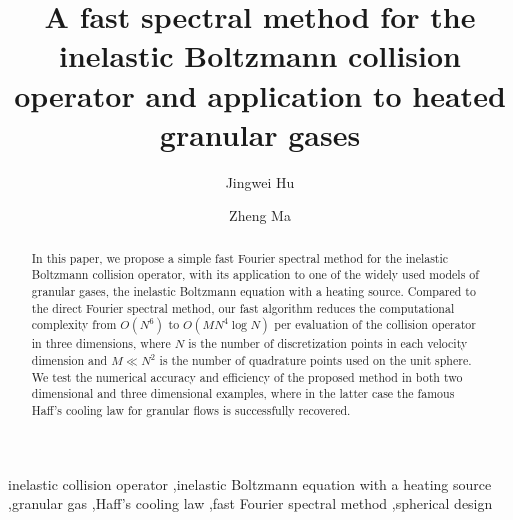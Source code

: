 \documentclass[review, times]{elsarticle}
\begin{document}
\begin{frontmatter}

\title{A fast spectral method for the inelastic Boltzmann collision operator and application to heated granular gases}


\author[mymainaddress]{Jingwei Hu}

\author[mymainaddress]{Zheng Ma}

\address[mymainaddress]{Department of Mathematics, Purdue University\\150 N. University Street, West Lafayette, IN 47907, USA}

\begin{abstract}
In this paper, we propose a simple fast Fourier spectral method for the inelastic Boltzmann collision operator, with its application to one of the widely used models of granular gases, the inelastic Boltzmann equation with a heating source. Compared to the direct Fourier spectral method, our fast algorithm reduces the computational complexity from $O\left(N^6\right)$ to $O\left(MN^4\log N \right)$ per evaluation of the collision operator in three dimensions, where $N$ is the number of discretization points in each velocity dimension and $M \ll N^2$ is the number of quadrature points used on the unit sphere. We test the numerical accuracy and efficiency of the proposed method in both two dimensional and three dimensional examples, where in the latter case the famous Haff's cooling law for granular flows is successfully recovered.
\end{abstract}


\begin{keyword}
inelastic collision operator \sep inelastic Boltzmann equation with a heating source  \sep granular gas \sep  Haff's cooling law \sep fast Fourier spectral method \sep spherical design 
\end{keyword}

\end{frontmatter}
\end{document}
